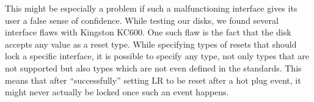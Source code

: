This might be especially a problem if such a malfunctioning interface gives its user a false sense of confidence. While testing our disks, we found several interface flaws with Kingston KC600. One such flaw is the fact that the disk accepts any value as a reset type. While specifying types of resets that should lock a specific interface, it is possible to specify any type, not only types that are not supported but also types which are not even defined in the standards. This means that after ``successfully'' setting LR to be reset after a hot plug event, it might never actually be locked once such an event happens.





